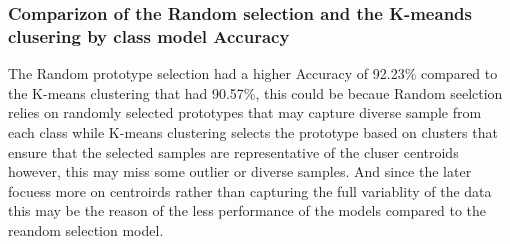 \documentclass{article}
\begin{document}
\subsubsection*{Comparizon of the Random selection and the K-meands clusering by class model Accuracy}
The Random prototype selection had a higher Accuracy of 92.23\% compared to the K-means clustering that had 90.57\%, this could be becaue Random seelction relies on randomly selected prototypes that
may capture diverse sample from each class while K-means clustering selects the prototype based on clusters that ensure that the selected samples are representative of the cluser centroids 
however, this may miss some outlier or diverse samples. And since the later focuess more on centroirds rather than capturing the full variablity of the data this may be the reason of the less performance of the models
compared to the reandom selection model.
\end{document}
